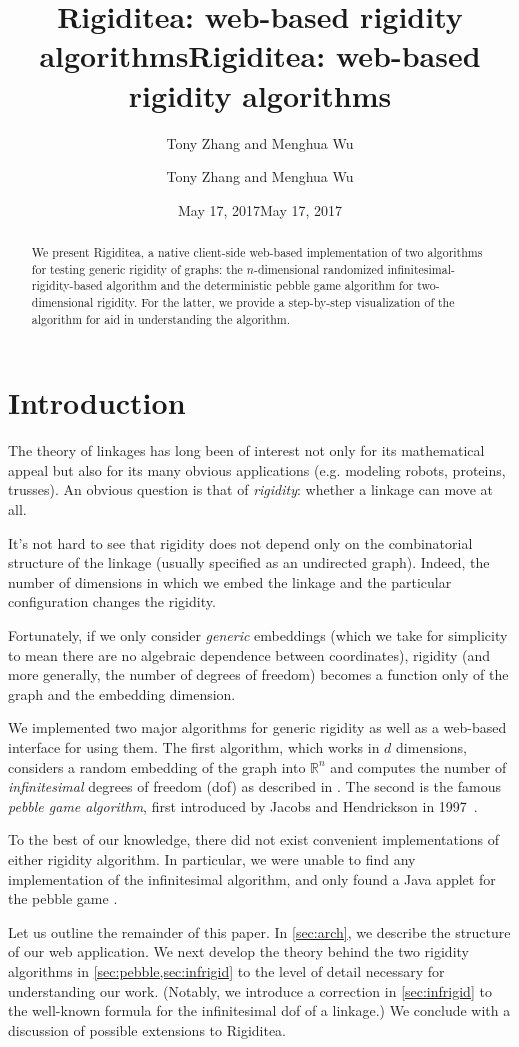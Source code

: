 \documentclass[aps,prd,final,twocolumn,letterpaper,nofootinbib]{revtex4-1}
\title{Rigiditea: web-based rigidity algorithms}
\author{Tony Zhang and Menghua Wu}
\date{May 17, 2017}
\newcommand\RR{\mathbb{R}}
\newcommand\headers{
    \title{Rigiditea: web-based rigidity algorithms}
    \author{Tony Zhang and Menghua Wu}
    \date{May 17, 2017}    
    \begin{abstract}
        We present Rigiditea,
        a native client-side web-based implementation of two algorithms
        for testing generic rigidity of graphs:
        the $n$-dimensional randomized infinitesimal-rigidity-based algorithm
        and the deterministic pebble game algorithm for two-dimensional rigidity.
        For the latter, we provide a step-by-step visualization of the algorithm
        for aid in understanding the algorithm.
    \end{abstract}
}
\begin{document}
\ifrevtex\headers\fi

\maketitle




\tableofcontents

\section{Introduction}

The theory of linkages has long been of interest
not only for its mathematical appeal
but also for its many obvious applications
(e.g. modeling robots, proteins, trusses).
An obvious question is that of \emph{rigidity}:
whether a linkage can move at all.

It's not hard to see that rigidity does not depend
only on the combinatorial structure of the linkage
(usually specified as an undirected graph).
Indeed, the number of dimensions in which we embed the linkage
and the particular configuration changes the rigidity.

Fortunately, if we only consider \emph{generic} embeddings
(which we take for simplicity to mean
there are no algebraic dependence between coordinates),
rigidity (and more generally, the number of degrees of freedom)
becomes a function only of the graph and the embedding dimension.

We implemented two major algorithms for generic rigidity
as well as a web-based interface for using them.
The first algorithm, which works in $d$ dimensions,
considers a random embedding of the graph into $\RR^n$
and computes the number of \emph{infinitesimal} degrees of freedom (dof)
as described in \cite[\S4.4.2]{gfalop}.
The second is the famous \emph{pebble game algorithm},
first introduced by Jacobs and Hendrickson in 1997~\cite{jacobs97}.

To the best of our knowledge,
there did not exist convenient implementations of
either rigidity algorithm.
In particular,
we were unable to find any implementation of the infinitesimal algorithm,
and only found a Java applet for the pebble game \cite{stjohnapplet}.

Let us outline the remainder of this paper.
In \cref{sec:arch}, we describe the structure of our web application.
We next develop the theory behind the two rigidity algorithms
in \cref{sec:pebble,sec:infrigid}
to the level of detail necessary for understanding our work.
(Notably, we introduce a correction in \cref{sec:infrigid}
to the well-known formula for the infinitesimal dof of a linkage.)
We conclude with a discussion of possible extensions to Rigiditea.
\end{document}
